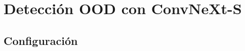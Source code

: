 
\chapter{Detección OOD con ConvNeXt-S}\label{ap:convnext}


\section{Configuración}\label{sec:apd-config}

